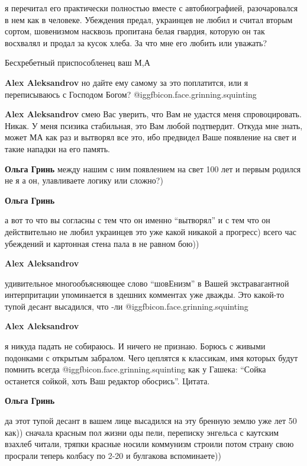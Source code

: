 \begin{itemize}
\begin{itemize}
\begin{itemize}
я перечитал его практически полностью вместе с автобиографией, разочаровался в
нем как в человеке. Убеждения предал, украинцев не любил и считал вторым
сортом, шовенизмом насквозь пропитана белая гвардия, которую он так восхвалял и
продал за кусок хлеба. За что мне его любить или уважать?


Бесхребетный приспособленец ваш М,А

\textbf{Alex Aleksandrov} но дайте ему самому за это поплатится, или я переписываюсь с Господом Богом? @igg{fbicon.face.grinning.squinting} 

\textbf{Alex Aleksandrov} смею Вас уверить, что Вам не удастся меня спровоцировать. Никак. У меня псизика стабильная, это Вам любой подтвердит. Откуда мне знать, может МА как раз и вытворял все это, ибо предвидел Ваше появление на свет и такие нападки на его память.

\textbf{Ольга Гринь} между нашим с ним появлением на свет 100 лет и первым родился не я а он, улавливаете логику или сложно?)

\textbf{Ольга Гринь} 

а вот то что вы согласны с тем что он именно \enquote{вытворял} и с тем что он
действительно не любил украинцев это уже какой никакой а прогресс) всего час
убеждений и картонная стена пала в не равном бою))


\textbf{Alex Aleksandrov} 

удивительное многообъясняющее слово \enquote{шовЕнизм} в Вашей экстравагантной
интерпритации упоминается в здешних комментах уже дважды. Это какой-то тупой
десант высадился, что -ли @igg{fbicon.face.grinning.squinting} 

\textbf{Alex Aleksandrov} 

я никуда падать не собираюсь. И ничего не признаю. Борюсь с живыми подонками с
открытым забралом. Чего цеплятся к классикам, имя которых будут помнить
всегда @igg{fbicon.face.grinning.squinting}  как у Гашека: \enquote{Сойка останется сойкой, хоть Ваш редактор обосрись}.
Цитата.


\textbf{Ольга Гринь} 

да этот тупой десант в вашем лице высадился на эту бренную землю уже лет 50
как)) сначала красным пол жизни оды пели, переписку энгельса с каутским взахлеб
читали, тряпки красные носили коммунизм строили потом страну свою просрали
теперь колбасу по 2-20 и булгакова вспоминаете))


\end{itemize}
\end{itemize}
\end{itemize}
